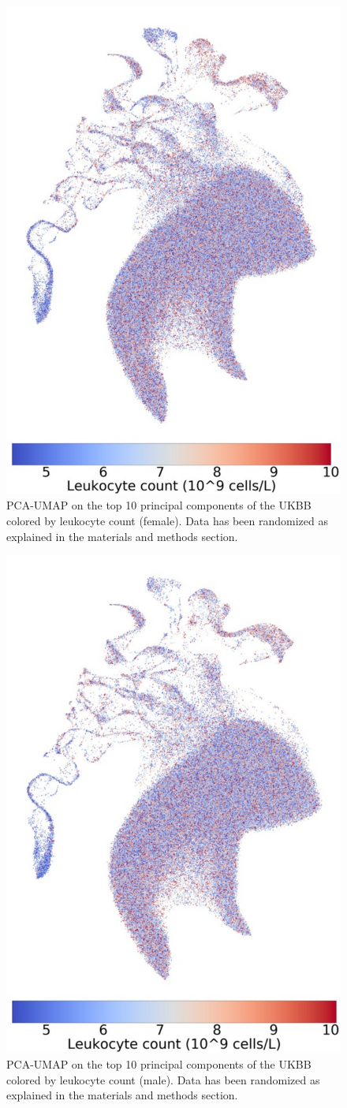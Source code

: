 \documentclass[12pt]{pnas-new}
\begin{document}
\begin{figure}
    \centering
    \includegraphics[width=0.4\columnwidth]{images/UKBB_UMAP_PC10_NN15_MD05_2018328174511_201871416519_leukocyte_count_pct5_f.pdf}
    \caption{PCA-UMAP on the top 10 principal components of the UKBB colored by leukocyte count (female). Data has been randomized as explained in the materials and methods section.}
    \label{fig:supp_ukbb_leukocyte_f}
\end{figure}

\begin{figure}
    \centering
    \includegraphics[width=0.4\columnwidth]{images/UKBB_UMAP_PC10_NN15_MD05_2018328174511_201871416519_leukocyte_count_pct5_m.pdf}
    \caption{PCA-UMAP on the top 10 principal components of the UKBB colored by leukocyte count (male). Data has been randomized as explained in the materials and methods section.}
    \label{fig:supp_ukbb_leukocyte_m}
\end{figure}
\end{document}

